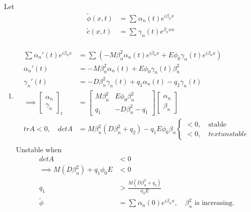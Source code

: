 \documentclass{article}
\theoremstyle{remark}
\begin{document}
 Let \[
 \begin{split}
   \widetilde{\phi }\left( x,t \right) &=  \sum_{}^{} \alpha _{n} \left( t \right) e^{i\beta _{n} x}  \\
   \widetilde{c}\left( x,t \right) &=  \sum_{}^{} \gamma _{n}\left( t \right) e^{\beta _{n} x n} \\
 \end{split} 
 \] 
 \begin{enumerate}[label=(\roman*)]
   \item \[
       \begin{split}
   \sum_{}^{}  \alpha _{n}'  \left( t \right) e^{i\beta _{n}x}  & = \sum_{}^{}  \left( -M \beta ^{2}_{n} \alpha _{n} \left( t \right) e^{i \beta _{n} x} + E \phi _{0} \gamma _{n} \left( t \right) e^{i \beta _{n} x} \right) \\
   \alpha _{n}'  \left( t \right)  & = -M \beta _{n}^{2} \alpha _{n} \left( t \right) + E \phi _{0} \gamma _{n}\left( t \right) \beta ^{2}_{n} \\
   \gamma _{n}' \left( t \right) &=  -D \beta _{n}^2 \gamma _{n} \left( t \right) + q _{1} \alpha _{n} \left( t \right) -  q_{2} \gamma _{n}\left( t \right) \\
   \implies \begin{bmatrix} 
   \alpha _{n} \\
   \gamma _{n}
   \end{bmatrix} 
   _{t}
   &= \begin{bmatrix} 
   M \beta _{n}^2  &  E \phi _{0} \beta _{n} ^2 \\
   q_{1}  &  -D \beta _{n}^2 - q_{1}
   \end{bmatrix} 
   \begin{bmatrix} 
   \alpha _{n } \\
   \beta _{n}
   \end{bmatrix} 
    \\
    trA < 0 , \quad  det A &=  M\beta _{n}^2 \left( D \beta _{n}^2 + q_{2} \right) - q_{1} E \phi _{0}\beta _{n} \begin{cases}
      <0 , \quad \text{stable}  \\
      <0 ,  \quad  text{unstable}
    \end{cases} \\ 
       \end{split} 
   \] 
   Unstable when \[
     \begin{split}
   det A  & < 0 \\
   \implies  M\left( D \beta _{n} ^{2} \right) + q_{1} \phi _{0} E  & < 0  \\
  q_{1}  & > \frac{M\left( D \beta _{n} ^2 + q_{2} \right)}{ \phi _{0} E}  \\
  \widetilde{\phi } &=  \sum_{}^{} \alpha _{n}\left( 0 \right) e^{i \beta _{n}x}  , \quad  \beta _{n}^2 \text{ is increasing.}\\
     \end{split} 
   \] 

 \end{enumerate}
\end{document}
